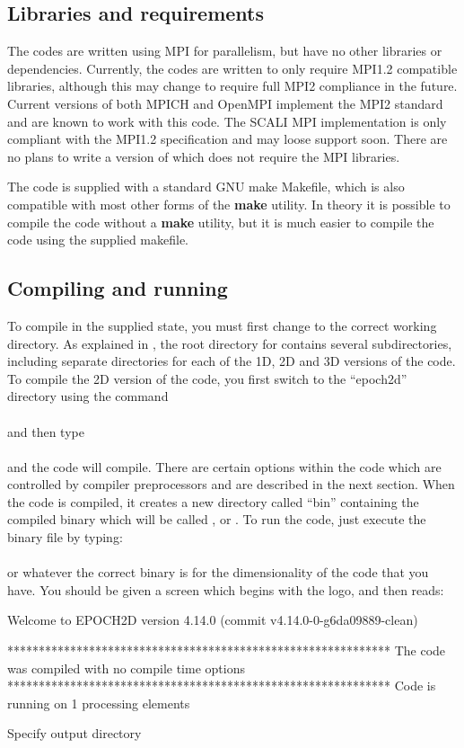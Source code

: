 \subsection{Libraries and requirements}
The {\EPOCH} codes are written using MPI for parallelism, but have no other
libraries or dependencies. Currently, the codes are written to only require
MPI1.2 compatible libraries, although this may change to require full MPI2
compliance in the future. Current versions of both MPICH and OpenMPI implement
the MPI2 standard and are known to work with this code. The SCALI MPI
implementation is only compliant with the MPI1.2 specification and may loose
support soon.
There are no plans to write a version of {\EPOCH} which does not require
the MPI libraries.

The code is supplied with a standard GNU make Makefile, which is also
compatible with most other forms of the {\bf make} utility. In theory it is
possible to compile the code without a {\bf make} utility, but it is much
easier to compile the code using the supplied makefile.

\subsection{Compiling and running {\EPOCH}}

To compile {\EPOCH} in the supplied state, you must first change to the
correct working directory. As explained in , the
root directory for {\EPOCH} contains several subdirectories, including
separate directories for each of the 1D, 2D and 3D versions of the code.
To compile the 2D version of the code, you first switch to the ``epoch2d''
directory using the command\\
\indent{}\\
and then type\\
\indent{}\\
and the code will compile. There are certain options within the code which are
controlled by compiler preprocessors and are described in the next
section. When the code is compiled, it creates a new directory called ``bin''
containing the compiled binary which will be called ,
 or . To run the code, just execute the
binary file by typing:\\
\indent{}\\
or whatever the correct binary is for the dimensionality of the code that you
have. You should be given a screen which begins with the {\EPOCH} logo, and then
reads:
\begin{boxverbatim}
 Welcome to EPOCH2D version 4.14.0   (commit v4.14.0-0-g6da09889-clean)

 *************************************************************
 The code was compiled with no compile time options
 *************************************************************
 Code is running on 1 processing elements

 Specify output directory
\end{boxverbatim}

